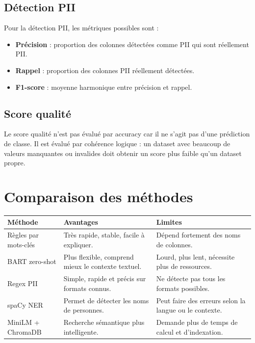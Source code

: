 \documentclass[12pt,a4paper]{report}
\begin{document}
\subsection{Détection PII}

Pour la détection PII, les métriques possibles sont :

\begin{itemize}
    \item \textbf{Précision} : proportion des colonnes détectées comme PII qui sont réellement PII.
    \item \textbf{Rappel} : proportion des colonnes PII réellement détectées.
    \item \textbf{F1-score} : moyenne harmonique entre précision et rappel.
\end{itemize}

\subsection{Score qualité}

Le score qualité n'est pas évalué par accuracy car il ne s'agit pas d'une prédiction de classe. Il est évalué par cohérence logique : un dataset avec beaucoup de valeurs manquantes ou invalides doit obtenir un score plus faible qu'un dataset propre.

\section{Comparaison des méthodes}

\begin{longtable}{p{4cm}p{5cm}p{5cm}}
\toprule
\textbf{Méthode} & \textbf{Avantages} & \textbf{Limites} \\
\midrule
Règles par mots-clés & Très rapide, stable, facile à expliquer. & Dépend fortement des noms de colonnes. \\
BART zero-shot & Plus flexible, comprend mieux le contexte textuel. & Lourd, plus lent, nécessite plus de ressources. \\
Regex PII & Simple, rapide et précis sur formats connus. & Ne détecte pas tous les formats possibles. \\
spaCy NER & Permet de détecter les noms de personnes. & Peut faire des erreurs selon la langue ou le contexte. \\
MiniLM + ChromaDB & Recherche sémantique plus intelligente. & Demande plus de temps de calcul et d'indexation. \\
\bottomrule
\end{longtable}
\end{document}
